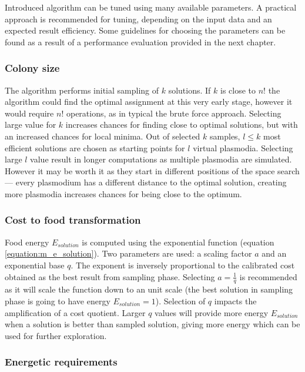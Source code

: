 Introduced algorithm can be tuned using many available parameters. A practical approach is recommended for tuning, depending on the input data and an expected result efficiency. Some guidelines for choosing the parameters can be found as a result of a performance evaluation provided in the next chapter.

\subsubsection{Colony size}

The algorithm performs initial sampling of $k$ solutions. If $k$ is close to $n!$ the algorithm could find the optimal assignment at this very early stage, however it would require $n!$ operations, as in typical the brute force approach. Selecting large value for $k$ increases chances for finding close to optimal solutions, but with an increased chances for local minima. Out of selected $k$ samples, $l \leq k$ most efficient solutions are chosen as starting points for $l$ virtual plasmodia. Selecting large $l$ value result in longer computations as multiple plasmodia are simulated. However it may be worth it as they start in different positions of the space search --- every plasmodium has a different distance to the optimal solution, creating more plasmodia increases chances for being close to the optimum.


\subsubsection{Cost to food transformation}

Food energy $E_{solution}$ is computed using the exponential function (equation \ref{equation:m_e_solution}). Two parameters are used: a scaling factor $a$ and  an exponential base $q$. The exponent is inversely proportional to the calibrated cost obtained as the best result from sampling phase. Selecting $a = \frac{1}{q}$ is recommended as it will scale the function down to an unit scale (the best solution in sampling phase is going to have energy $E_{solution} = 1$). Selection of $q$ impacts the amplification of a cost quotient. Larger $q$ values will provide more energy $E_{solution}$ when a solution is better than sampled solution, giving more energy which can be used for further exploration.


\subsubsection{Energetic requirements}

